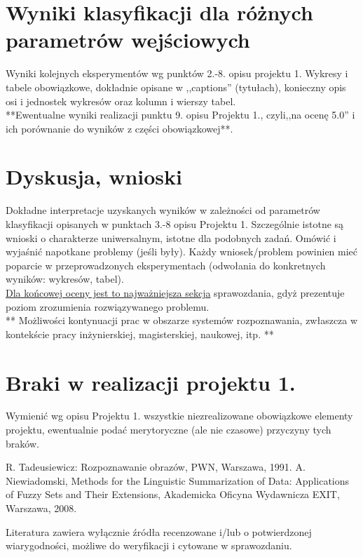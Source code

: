 \documentclass{classrep}
\begin{document}
\section{Wyniki klasyfikacji dla różnych parametrów wejściowych}
Wyniki kolejnych eksperymentów wg punktów 2.-8. opisu projektu 1.  Wykresy i tabele
obowiązkowe, dokładnie opisane w ,,captions'' (tytułach), konieczny opis osi i
jednostek wykresów oraz kolumn i wierszy tabel.\\ 

{**Ewentualne wyniki realizacji punktu 9. opisu Projektu 1., czyli,,na ocenę 5.0'' i ich porównanie do wyników z
części obowiązkowej**.}\\



\section{Dyskusja, wnioski}
Dokładne interpretacje uzyskanych wyników w zależności od parametrów klasyfikacji
opisanych w punktach 3.-8 opisu Projektu 1. 
Szczególnie istotne są wnioski o charakterze uniwersalnym, istotne dla podobnych zadań. 
Omówić i wyjaśnić napotkane problemy (jeśli były). Każdy wniosek/problem powinien mieć poparcie
w przeprowadzonych eksperymentach (odwołania do konkretnych wyników: wykresów,
tabel). \\
\underline{Dla końcowej oceny jest to najważniejsza sekcja} sprawozdania, gdyż prezentuje poziom
zrozumienia rozwiązywanego problemu.\\

** Możliwości kontynuacji prac w obszarze systemów rozpoznawania, zwłaszcza w kontekście pracy inżynierskiej,
magisterskiej, naukowej, itp. **\\



\section{Braki w realizacji projektu 1.}
Wymienić wg opisu Projektu 1. wszystkie niezrealizowane obowiązkowe elementy projektu, ewentualnie
podać merytoryczne (ale nie czasowe) przyczyny tych braków. 


\begin{thebibliography}{0}
 R. Tadeusiewicz: Rozpoznawanie obrazów, PWN, Warszawa, 1991.  
 A. Niewiadomski, Methods for the Linguistic Summarization of Data: Applications of Fuzzy Sets and Their Extensions, Akademicka Oficyna Wydawnicza EXIT, Warszawa, 2008.
\end{thebibliography}

Literatura zawiera wyłącznie źródła recenzowane i/lub o potwierdzonej wiarygodności,
możliwe do weryfikacji i cytowane w sprawozdaniu. 
\end{document}
